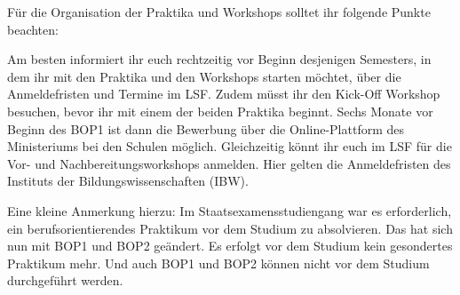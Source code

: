 Für die Organisation der Praktika und Workshops solltet ihr folgende Punkte beachten:

Am besten informiert ihr euch rechtzeitig vor Beginn desjenigen Semesters, in dem ihr mit den Praktika und den Workshops starten möchtet, über die Anmeldefristen und Termine im LSF. Zudem müsst ihr den Kick-Off Workshop besuchen, bevor ihr mit einem der beiden Praktika beginnt. Sechs Monate vor Beginn des BOP1 ist dann die Bewerbung über die Online-Plattform des Ministeriums bei den Schulen möglich. Gleichzeitig könnt ihr euch im LSF für die Vor- und Nachbereitungsworkshops anmelden. Hier gelten die Anmeldefristen des  Instituts der Bildungswissenschaften (IBW).

Eine kleine Anmerkung hierzu: Im Staatsexamensstudiengang war es erforderlich, ein berufsorientierendes Praktikum vor dem Studium zu absolvieren. Das hat sich nun mit BOP1 und BOP2 geändert. Es erfolgt vor dem Studium kein gesondertes Praktikum mehr. Und auch BOP1 und BOP2 können nicht vor dem Studium durchgeführt werden.
